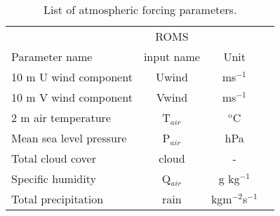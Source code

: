 \begin{table}[t]
 \begin{center}
  \caption{List of atmospheric forcing parameters.}
   \begin{tabular}{lccl}
   \hline
    					& ROMS			& 		\\
    Parameter name			& input name		& Unit		\\
   \hline
    10 m U wind component		& Uwind			& ms$^{-1}$	\\
    10 m V wind component 		& Vwind			& ms$^{-1}$	\\
    2 m air temperature			& T$_{air}$		& $^{\text{o}}$C	\\
    Mean sea level pressure		& P$_{air}$		& hPa		\\
    Total cloud cover			& cloud			& -		\\
    Specific humidity			& Q$_{air}$		& g kg$^{-1}$	\\
    Total precipitation			& rain			& kgm$^{-2}$s$^{-1}$		\\
   \hline
   \end{tabular}
  \label{tab:atmos_para}
 \end{center}
\end{table} 

